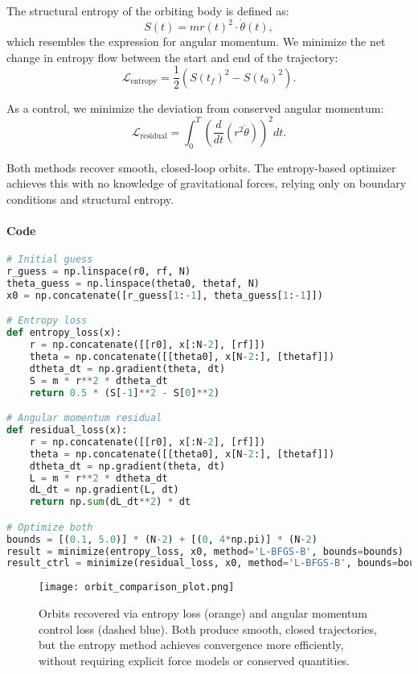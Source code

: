 \documentclass[12pt]{article}
\begin{document}
The structural entropy of the orbiting body is defined as:
\[
S(t) = m r(t)^2 \cdot \dot{\theta}(t),
\]
which resembles the expression for angular momentum. We minimize the net change in entropy flow between the start and end of the trajectory:
\[
\mathcal{L}_{\text{entropy}} = \frac{1}{2} \left(S(t_f)^2 - S(t_0)^2\right).
\]

As a control, we minimize the deviation from conserved angular momentum:
\[
\mathcal{L}_{\text{residual}} = \int_0^T \left(\frac{d}{dt}(r^2 \dot{\theta})\right)^2 dt.
\]

Both methods recover smooth, closed-loop orbits. The entropy-based optimizer achieves this with no knowledge of gravitational forces, relying only on boundary conditions and structural entropy.

\paragraph*{Code}\mbox{}
\begin{lstlisting}[language=Python]
# Initial guess
r_guess = np.linspace(r0, rf, N)
theta_guess = np.linspace(theta0, thetaf, N)
x0 = np.concatenate([r_guess[1:-1], theta_guess[1:-1]])

# Entropy loss
def entropy_loss(x):
    r = np.concatenate([[r0], x[:N-2], [rf]])
    theta = np.concatenate([[theta0], x[N-2:], [thetaf]])
    dtheta_dt = np.gradient(theta, dt)
    S = m * r**2 * dtheta_dt
    return 0.5 * (S[-1]**2 - S[0]**2)

# Angular momentum residual
def residual_loss(x):
    r = np.concatenate([[r0], x[:N-2], [rf]])
    theta = np.concatenate([[theta0], x[N-2:], [thetaf]])
    dtheta_dt = np.gradient(theta, dt)
    L = m * r**2 * dtheta_dt
    dL_dt = np.gradient(L, dt)
    return np.sum(dL_dt**2) * dt

# Optimize both
bounds = [(0.1, 5.0)] * (N-2) + [(0, 4*np.pi)] * (N-2)
result = minimize(entropy_loss, x0, method='L-BFGS-B', bounds=bounds)
result_ctrl = minimize(residual_loss, x0, method='L-BFGS-B', bounds=bounds)
\end{lstlisting}

\begin{figure}[H]
\centering
\texttt{[image: orbit\_comparison\_plot.png]}
\caption{
Orbits recovered via entropy loss (orange) and angular momentum control loss (dashed blue). Both produce smooth, closed trajectories, but the entropy method achieves convergence more efficiently, without requiring explicit force models or conserved quantities.
}
\end{figure}
\end{document}
